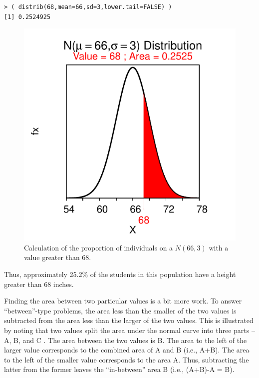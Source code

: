 \documentclass[10pt,openany]{book}\usepackage[]{graphicx}\usepackage[]{color}
\makeatletter
\newenvironment{kframe}{%
 \def\at@end@of@kframe{}%
 \ifinner\ifhmode%
  \def\at@end@of@kframe{\end{minipage}}%
  \begin{minipage}{\columnwidth}%
 \fi\fi%
 \def\FrameCommand##1{\hskip\@totalleftmargin \hskip-\fboxsep
 \colorbox{shadecolor}{##1}\hskip-\fboxsep
     \hskip-\linewidth \hskip-\@totalleftmargin \hskip\columnwidth}%
 \MakeFramed {\advance\hsize-\width
   \@totalleftmargin\z@ \linewidth\hsize
   \@setminipage}}%
 {\par\unskip\endMakeFramed%
 \at@end@of@kframe}
\newenvironment{knitrout}{}{} %
\makeatother
\begin{document}
\begin{knitrout}
\color{fgcolor}\begin{kframe}
\begin{verbatim}
> ( distrib(68,mean=66,sd=3,lower.tail=FALSE) )
[1] 0.2524925
\end{verbatim}
\end{kframe}\begin{figure}[hbtp]

{\centering \includegraphics[width=.4\linewidth]{Figs/NormZCalc2-1} 

}

\caption[Calculation of the proportion of individuals on a $N(66,3)$ with a value greater than 68]{Calculation of the proportion of individuals on a $N(66,3)$ with a value greater than 68.}\label{fig:NormZCalc2}
\end{figure}


\end{knitrout}
Thus, approximately 25.2\% of the students in this population have a height greater than 68 inches.


Finding the area between two particular values is a bit more work.  To answer ``between''-type problems, the area less than the smaller of the two values is subtracted from the area less than the larger of the two values.  This is illustrated by noting that two values split the area under the normal curve into three parts -- A, B, and C .  The area between the two values is B.  The area to the left of the larger value corresponds to the combined area of A and B (i.e., A+B).  The area to the left of the smaller value corresponds to the area A.  Thus, subtracting the latter from the former leaves the ``in-between'' area B (i.e., (A+B)-A = B).
\end{document}

